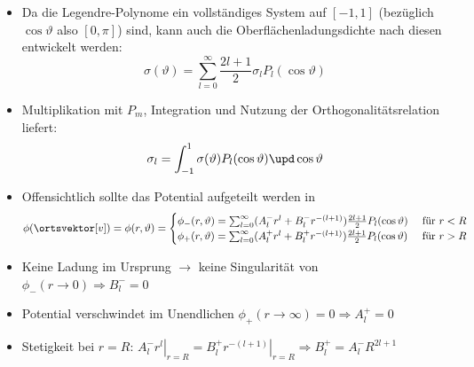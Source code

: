 \begin{frame}
\begin{itemize}[<+->]
\item Da die Legendre-Polynome ein vollständiges System auf $[-1,1]$ (bezüglich $\cos\vartheta$ also $[0,\pi]$) sind, kann auch die Oberflächenladungsdichte nach diesen entwickelt werden:
  $$
  \sigma(\vartheta) = \sum_{l=0}^{\infty}  \frac{2l+1}{2} \sigma_l P_l (\cos\vartheta)
  $$
\item Multiplikation mit $P_m$, Integration und Nutzung der Orthogonalitätsrelation liefert:
  $$
  \sigma_l = \int_{-1}^{1} \sigma(\vartheta) P_l(\cos\vartheta) \upd \cos\vartheta
  $$
\item Offensichtlich sollte das Potential aufgeteilt werden in
  $$
  \phi(\ortsvektor[v]) = \phi(r,\vartheta) = \begin{cases}
    \phi_- (r,\vartheta) = \sum_{l=0}^{\infty} (A_{l}^- r^l+ B_{l}^- r^{-(l+1)}) \frac{2l+1}{2} P_l (\cos\vartheta) & \text{ für } r < R \\
    \phi_+ (r,\vartheta)=\sum_{l=0}^{\infty} (A_{l}^+ r^l+ B_{l}^+ r^{-(l+1)}) \frac{2l+1}{2} P_l (\cos\vartheta) & \text{ für } r > R
    \end{cases}
    $$
  \item Keine Ladung im Ursprung $\to$ keine Singularität von $\phi_-(r\to 0) \Rightarrow \boxed{B_l^- =0}$
  \item Potential verschwindet im Unendlichen $\phi_+(r\to \infty) = 0  \Rightarrow \boxed{A_l^+ =0}$
    \item Stetigkeit bei $r=R$: $\left. A_{l}^- r^l\right|_{r=R} = \left. B_{l}^+ r^{-(l+1)}\right|_{r=R} \Rightarrow \boxed{B_{l}^+ = A_{l}^- R^{2l+1} } $  
 \end{itemize} 
\end{frame}

